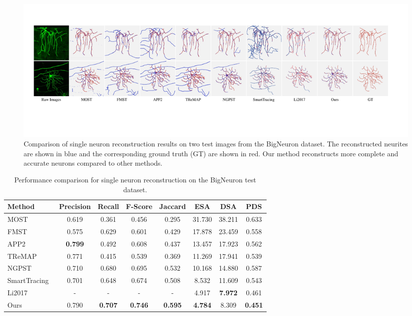 \begin{figure}[th]
	\centering
	\includegraphics[width=1\textwidth]{./Illustrations/BigNeuron_comparison.pdf}
	\caption{Comparison of single neuron reconstruction results on two test images from the BigNeuron dataset.
	The reconstructed neurites are shown in blue and the corresponding ground truth (GT) are shown in red.
	Our method reconstructs more complete and accurate neurons compared to other methods.
	}
	\label{fig:compare_BigNeuron}
\end{figure}

\begin{table}[th]
	\centering
	\makeatletter{}\makeatother
	\caption{Performance comparison for single neuron reconstruction on the BigNeuron test dataset.}
	\label{table:compare_BigNeuron}
	\begin{tabular}{lccccccc}
		\toprule
		Method & Precision & Recall & F-Score & Jaccard & ESA & DSA & PDS\\
		\midrule
		MOST~\cite{Wu2014} & 0.619 & 0.361 & 0.456 & 0.295 & 31.730 & 38.211 & 0.633\\
		FMST~\cite{Yang2019} & 0.575 & 0.629 & 0.601 & 0.429 & 17.878 & 23.459 & 0.558\\
		APP2~\cite{Xiao2013} & \textbf{0.799} & 0.492 & 0.608 & 0.437 & 13.457 & 17.923 & 0.562\\
		TReMAP~\cite{Zhou2016} & 0.771 & 0.415 & 0.539 & 0.369 & 11.269 & 17.941 & 0.539\\
		NGPST~\cite{Quan2015} & 0.710 & 0.680 & 0.695 & 0.532 & 10.168 & 14.880 & 0.587\\
		SmartTracing~\cite{Chen2015} & 0.701 & 0.648 & 0.674 & 0.508 & 8.532 & 11.609 & 0.543\\
		Li2017~\cite{Li2017} & - & - & - & - & 4.917 & \textbf{7.972} &0.461 \\
		\midrule
		Ours & 0.790 & \textbf{0.707} & \textbf{0.746}  & \textbf{0.595} & \textbf{4.784} & 8.309 & \textbf{0.451}\\
		\bottomrule
	\end{tabular}
\end{table}

